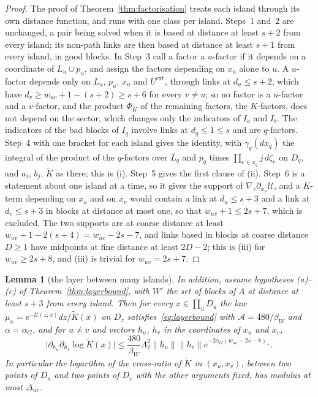 \documentclass[11pt]{amsart}
\newtheorem{lemma}[theorem]{Lemma}
\theoremstyle{definition}
\theoremstyle{remark}
\numberwithin{equation}{section}
\begin{document}
\begin{proof}
The proof of Theorem~\ref{thm:factorisation} treats each island through
its own distance function, and runs with one class per island. Steps~1
and~2 are unchanged, a pair being solved when it is based at distance at
least $s+2$ from every island; its non-path links are then based at
distance at least $s+1$ from every island, in good blocks. In Step~3 call a
factor a $u$-factor if it depends on a coordinate of $L_u\cup p_u$, and
assign the factors depending on $x_u$ alone to $u$. A $u$-factor depends
only on $L_u$, $p_u$, $x_u$ and $U^{\mathrm{ext}}$, through links at
$d_u\le s+2$, which have $d_v\ge w_{uv}+1-(s+2)\ge s+6$ for every $v\ne u$;
so no factor is a $u$-factor and a $v$-factor, and the product $\Phi_K$ of
the remaining factors, the $K$-factors, does not depend on the sector,
which changes only the indicators of $I_a$ and $I_b$. The indicators of the
bad blocks of $I_q$ involve links at $d_q\le1\le s$ and are $q$-factors.
Step~4 with one bracket for each island gives the identity, with
$\gamma_q(dx_q)$ the integral of the product of the $q$-factors over $L_q$
and $p_q$ times $\prod_{e\in x_q}j\,d\zeta_e$ on $D_q$, and $a_i$, $b_j$,
$\tilde K$ as there; this is (i). Step~5 gives the first clause of (ii).
Step~6 is a statement about one island at a time, so it gives the support
of $\nabla_z\partial_{x_u}\mathcal U$, and a $K$-term depending on $x_u$
and on $x_v$ would contain a link at $d_u\le s+3$ and a link at $d_v\le
s+3$ in blocks at distance at most one, so that $w_{uv}+1\le2s+7$, which
is excluded. The two supports are at coarse distance at least
$w_{uv}+1-2(s+4)=w_{uv}-2s-7$, and links based in blocks at coarse
distance $D\ge1$ have midpoints at fine distance at least $2D-2$; this is
(iii) for $w_{uv}\ge2s+8$, and (iii) is trivial for $w_{uv}=2s+7$.
\end{proof}

\begin{lemma}[the layer between many islands]\label{lem:manylayer}
In addition, assume hypotheses (a)--(c) of Theorem~\ref{thm:layerbound},
with $W'$ the set of blocks of $\Lambda$ at distance at least $s+3$ from
every island. Then for every $x\in\prod_uD_u$ the law $\mu_x=e^{-\mathcal U
(z;x)}dz/\tilde K(x)$ on $D_z$ satisfies~\eqref{eq:layerbound} with
$\mathcal A=480/\beta_W$ and $\alpha=\alpha_G$, and for $u\ne v$ and vectors
$h_u$, $h_v$ in the coordinates of $x_u$ and $x_v$,
\[
\bigl\lvert\partial_{h_u}\partial_{h_v}\log\tilde K(x)\bigr\rvert\le
\frac{480}{\beta_W}\Lambda_2^2\lVert h_u\rVert\lVert h_v\rVert
e^{-2\alpha_G(w_{uv}-2s-8)_+}.
\]
In particular the logarithm of the cross-ratio of $\tilde K$ in
$(x_u,x_v)$, between two points of $D_u$ and two points of $D_v$ with the
other arguments fixed, has modulus at most $\varDelta_{uv}$.
\end{lemma}
\end{document}
